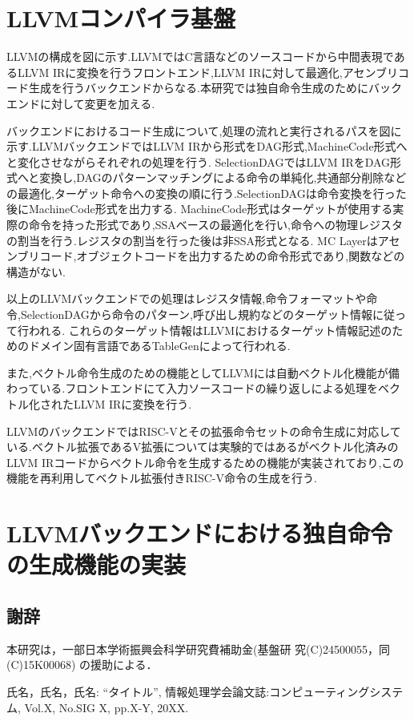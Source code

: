 \documentclass[a4paper,9pt, twocolumn]{jarticle}
\renewcommand{\baselinestretch}{0.87}   %
\begin{document}
\section{LLVMコンパイラ基盤}
LLVMの構成を図に示す.LLVMではC言語などのソースコードから中間表現であるLLVM IRに変換を行うフロントエンド,LLVM IRに対して最適化,アセンブリコード生成を行うバックエンドからなる.本研究では独自命令生成のためにバックエンドに対して変更を加える.

バックエンドにおけるコード生成について,処理の流れと実行されるパスを図に示す.LLVMバックエンドではLLVM IRから形式をDAG形式,MachineCode形式へと変化させながらそれぞれの処理を行う.
SelectionDAGではLLVM IRをDAG形式へと変換し,DAGのパターンマッチングによる命令の単純化,共通部分削除などの最適化,ターゲット命令への変換の順に行う.SelectionDAGは命令変換を行った後にMachineCode形式を出力する.
MachineCode形式はターゲットが使用する実際の命令を持った形式であり,SSAベースの最適化を行い,命令への物理レジスタの割当を行う.レジスタの割当を行った後は非SSA形式となる.
MC Layerはアセンブリコード,オブジェクトコードを出力するための命令形式であり,関数などの構造がない.

以上のLLVMバックエンドでの処理はレジスタ情報,命令フォーマットや命令,SelectionDAGから命令のパターン,呼び出し規約などのターゲット情報に従って行われる.
これらのターゲット情報はLLVMにおけるターゲット情報記述のためのドメイン固有言語であるTableGenによって行われる.

また,ベクトル命令生成のための機能としてLLVMには自動ベクトル化機能が備わっている.フロントエンドにて入力ソースコードの繰り返しによる処理をベクトル化されたLLVM IRに変換を行う.

LLVMのバックエンドではRISC-Vとその拡張命令セットの命令生成に対応している.ベクトル拡張であるV拡張については実験的ではあるがベクトル化済みのLLVM IRコードからベクトル命令を生成するための機能が実装されており,この機能を再利用してベクトル拡張付きRISC-V命令の生成を行う.


\section{LLVMバックエンドにおける独自命令の生成機能の実装}

\renewcommand{\baselinestretch}{0.83}\selectfont
\subsection*{\small 謝辞}
\vspace{-0.5mm}
{\small 本研究は，一部日本学術振興会科学研究費補助金(基盤研
究(C)24500055，同(C)15K00068) の援助による．}


%
%
\begin{thebibliography}{9}
\itemsep -1.7pt

{\small 氏名，氏名，氏名:      %
\newblock ``タイトル'',
\newblock 情報処理学会論文誌:コンピューティングシステム,
\newblock Vol.X,
\newblock No.SIG X,
\newblock pp.X-Y,
\newblock 20XX.}

\end{thebibliography}
\end{document}
